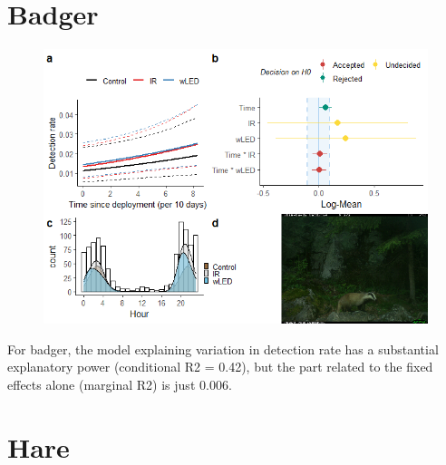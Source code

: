 \begin{table}[ht]
\newpage
\section{Badger}


\begin{figure}
		  \centering
	\includegraphics[scale=.9]{../R/glmm_sp_files/figure-html/grevling2-1.png}

\end{figure}

For badger, the model explaining variation in detection rate has a substantial explanatory power (conditional R2 = 0.42), but the part related to the fixed effects alone (marginal R2) is just 0.006.









\newpage
\section{Hare}



\end{table}

